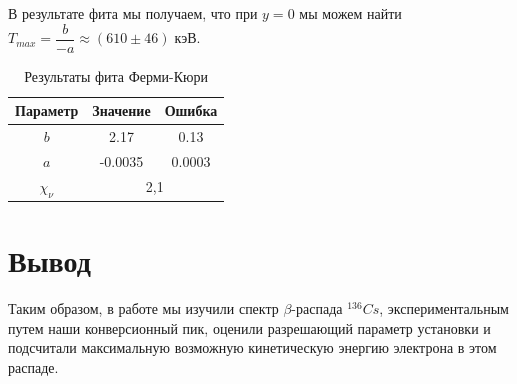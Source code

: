 \documentclass[12pt]{kiarticle}
\newcommand{\be}{\ensuremath{\beta}}
\begin{document}
В результате фита мы получаем, что при $ y = 0 $ мы можем найти $ T_{max} = \dfrac{b}{-a} \approx (610 \pm 46) \; кэВ $. 

\begin{table}[H]
	\caption{Результаты фита Ферми-Кюри}
	\label{fit_k}
	\begin{center}
		\begin{tabular}{|c|c|c|}
			\hline
			Параметр & Значение & Ошибка \\
			\hline 
			$ b $&2.17 & 0.13 \\
		$ a $ &	-0.0035 & 0.0003 \\
			\hline
			$ \chi_\nu $ & \multicolumn{2}{|c|}{2,1}  \\
			\hline
		\end{tabular}
	\end{center} 
\end{table}

	
	\section{Вывод}
	
	Таким образом, в работе мы изучили спектр \be-распада $  ^{136} Cs $, экспериментальным путем наши конверсионный пик, оценили разрешающий параметр установки и подсчитали максимальную возможную кинетическую энергию электрона в этом распаде.
	
	
	
\end{document}
